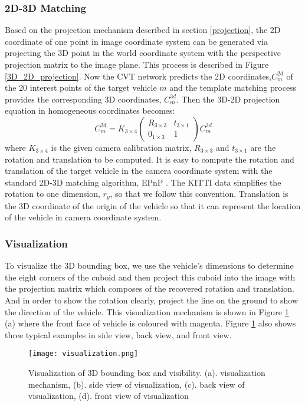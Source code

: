 \subsubsection{2D-3D Matching}

Based on the projection mechanism described in section \ref{projection}, the 2D coordinate of one point in image coordinate system can be generated via projecting the 3D point in the world coordinate system with the perspective projection matrix to the image plane. This process is described in Figure \ref{3D_2D_projection}. Now the CVT network predicts the 2D coordinates,$C_m^{2d}$ of the 20 interest points of the target vehicle $m$ and the template matching process provides the corresponding 3D coordinates, $C_m^{3d}$. Then the 3D-2D projection equation in homogeneous coordinates becomes:
\begin{equation}
	C_m^{2d} =   K_{3\times 4}
	\begin{pmatrix}
	R_{3\times 3} & t_{3\times 1}\\ 
	0_{1\times 3}& 1
	\end{pmatrix} C_m^{3d}
\end{equation}
where $K_{3\times 4}$ is the given camera calibration matrix, $R_{3\times 3}$ and $t_{3\times 1}$ are the rotation and translation to be computed. It is easy to compute the rotation and translation of the target vehicle in the camera coordinate system with the standard 2D-3D matching algorithm, EPnP \cite{Lepetit2008}. The KITTI data simplifies the rotation to one dimension, $r_y$, so that we follow this convention. Translation is the 3D coordinate of the origin of the vehicle so that it can represent the location of the vehicle in camera coordinate system.


\subsubsection{Visualization}
To visualize the 3D bounding box, we use the vehicle's dimensions to determine the eight corners of the cuboid and then project this cuboid into the image with the projection matrix which composes of the recovered rotation and translation. And in order to show the rotation clearly, project the line on the ground to show the direction of the vehicle. This visualization mechanism is shown in Figure \ref{figure:visualization} (a) where the front face of vehicle is coloured with magenta. Figure \ref{figure:visualization} also shows three typical examples in side view, back view, and front view.



\begin{figure}[h]		
	\texttt{[image: visualization.png]}
	\caption{Visualization of 3D bounding box and visibility. (a). visualization mechanism, (b). side view of visualization, (c). back view of visualization, (d). front view of visualization}
	\centering
	\label{figure:visualization}
\end{figure}





